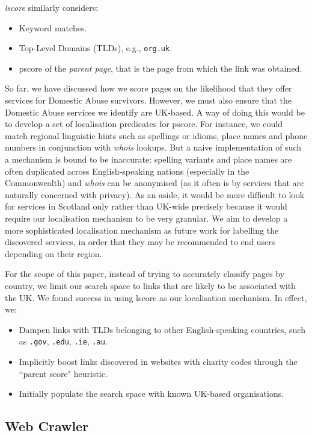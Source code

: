\documentclass[conference]{IEEEtran}
\begin{document}
\textit{lscore} similarly considers:
\begin{itemize}
    \item Keyword matches.
    \item Top-Level Domains (TLDs), e.g., \texttt{org.uk}.
    \item pscore of the \textit{parent page}, that is the page from which the link was obtained.
\end{itemize}

So far, we have discussed how we score pages on the likelihood that they offer services for Domestic Abuse survivors. 
However, we must also ensure that the Domestic Abuse services we identify are UK-based. 
A way of doing this would be to develop a set of localisation predicates for pscore. 
For instance, we could match regional linguistic hints such as spellings or idioms, place names and phone numbers in conjunction with \textit{whois} lookups. 
But a naive implementation of such a mechanism is bound to be inaccurate: spelling variants and place names are often duplicated across English-speaking nations (especially in the Commonwealth) and \textit{whois} can be anonymised (as it often is by services that are naturally concerned with privacy). 
As an aside, it would be more difficult to look for services in Scotland only rather than UK-wide precisely because it would require our localisation mechanism to be very granular. 
We aim to develop a more sophisticated localisation mechanism as future work for labelling the discovered services, in order that they may be recommended to end users depending on their region.

For the scope of this paper, instead of trying to accurately classify pages by country, we limit our search space to links that are likely to be associated with the UK. We found success in using lscore as our localisation mechanism. In effect, we:
\begin{itemize}
    \item Dampen links with TLDs belonging to other English-speaking countries, such as \texttt{.gov}, \texttt{.edu}, \texttt{.ie}, \texttt{.au}.
    \item Implicitly boost links discovered in websites with charity codes through the ``parent score" heuristic.
    \item Initially populate the search space with known UK-based organisations.
\end{itemize}

\subsection{Web Crawler}
\label{sec:crawl}
\end{document}
